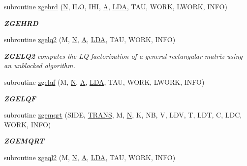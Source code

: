 \begin{DoxyCompactItemize}
subroutine \hyperlink{group__complex16GEcomputational_ga4de4b424a4c7b0a78f7138a94ec54671}{zgehrd} (\hyperlink{polmisc_8c_a0240ac851181b84ac374872dc5434ee4}{N}, I\+L\+O, I\+H\+I, \hyperlink{classA}{A}, \hyperlink{example__user_8c_ae946da542ce0db94dced19b2ecefd1aa}{L\+D\+A}, T\+A\+U, W\+O\+R\+K, L\+W\+O\+R\+K, I\+N\+F\+O)
\begin{DoxyCompactList}\small\item\em {\bfseries Z\+G\+E\+H\+R\+D} \end{DoxyCompactList}\item 
subroutine \hyperlink{group__complex16GEcomputational_ga3ef30af067557006a607c01cc2310955}{zgelq2} (M, \hyperlink{polmisc_8c_a0240ac851181b84ac374872dc5434ee4}{N}, \hyperlink{classA}{A}, \hyperlink{example__user_8c_ae946da542ce0db94dced19b2ecefd1aa}{L\+D\+A}, T\+A\+U, W\+O\+R\+K, I\+N\+F\+O)
\begin{DoxyCompactList}\small\item\em {\bfseries Z\+G\+E\+L\+Q2} computes the L\+Q factorization of a general rectangular matrix using an unblocked algorithm. \end{DoxyCompactList}\item 
subroutine \hyperlink{group__complex16GEcomputational_ga1ebfa1dc59e0f38a3e2eafd01e205fdb}{zgelqf} (M, \hyperlink{polmisc_8c_a0240ac851181b84ac374872dc5434ee4}{N}, \hyperlink{classA}{A}, \hyperlink{example__user_8c_ae946da542ce0db94dced19b2ecefd1aa}{L\+D\+A}, T\+A\+U, W\+O\+R\+K, L\+W\+O\+R\+K, I\+N\+F\+O)
\begin{DoxyCompactList}\small\item\em {\bfseries Z\+G\+E\+L\+Q\+F} \end{DoxyCompactList}\item 
subroutine \hyperlink{group__complex16GEcomputational_ga2f7eb86e8b8054f4167972eff1fb1131}{zgemqrt} (S\+I\+D\+E, \hyperlink{superlu__enum__consts_8h_a0c4e17b2d5cea33f9991ccc6a6678d62a1f61e3015bfe0f0c2c3fda4c5a0cdf58}{T\+R\+A\+N\+S}, M, \hyperlink{polmisc_8c_a0240ac851181b84ac374872dc5434ee4}{N}, K, N\+B, V, L\+D\+V, T, L\+D\+T, C, L\+D\+C, W\+O\+R\+K, I\+N\+F\+O)
\begin{DoxyCompactList}\small\item\em {\bfseries Z\+G\+E\+M\+Q\+R\+T} \end{DoxyCompactList}\item 
subroutine \hyperlink{group__complex16GEcomputational_gaae01a329f8f1958d643005e502c0618a}{zgeql2} (M, \hyperlink{polmisc_8c_a0240ac851181b84ac374872dc5434ee4}{N}, \hyperlink{classA}{A}, \hyperlink{example__user_8c_ae946da542ce0db94dced19b2ecefd1aa}{L\+D\+A}, T\+A\+U, W\+O\+R\+K, I\+N\+F\+O)

\end{DoxyCompactItemize}
